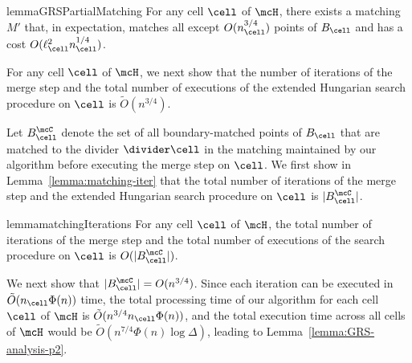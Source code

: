 \begin{restatable}{lemma}{GRSPartialMatching}\label{lemma:GRS-matching}
    For any cell $\cell$ of $\mcH$, there exists a matching $M'$ that, in expectation, matches all except $O(n_\cell^{3/4})$ points of $B_\cell$ and has a cost $O(\ell_\cell^2 n_\cell^{1/4})$.
\end{restatable}










%
%
%

For any cell $\cell$ of $\mcH$, we next show that the number of iterations of the merge step and the total number of executions of the extended Hungarian search procedure on $\cell$ is $\tilde{O}(n^{3/4})$.


Let $B_\cell^\mcC$ denote the set of all boundary-matched points of $B_\cell$ that are matched to the divider $\divider\cell$ in the matching maintained by our algorithm before executing the merge step on $\cell$. We first show in Lemma~\ref{lemma:matching-iter} that the total number of iterations of the merge step and the extended Hungarian search procedure on $\cell$ is $|B_\cell^\mcC|$.



\begin{restatable}{lemma}{matchingIterations}\label{lemma:matching-iter}
    For any cell $\cell$ of $\mcH$, the total number of iterations of the merge step and the total number of executions of the search procedure on $\cell$ is $O(|B_\cell^\mcC|)$.
\end{restatable}





We next show that $|B_\cell^\mcC|=O(n^{3/4})$. 
Since each iteration can be executed in $\tilde{O}(n_\cell\Phi(n))$ time, the total processing time of our algorithm for each cell $\cell$ of $\mcH$ is $\tilde{O}(n^{3/4}n_\cell\Phi(n))$, and the total execution time across all cells of $\mcH$ would be $\tilde{O}(n^{7/4}\Phi(n)\log\Delta)$, leading to Lemma~\ref{lemma:GRS-analysis-p2}.

